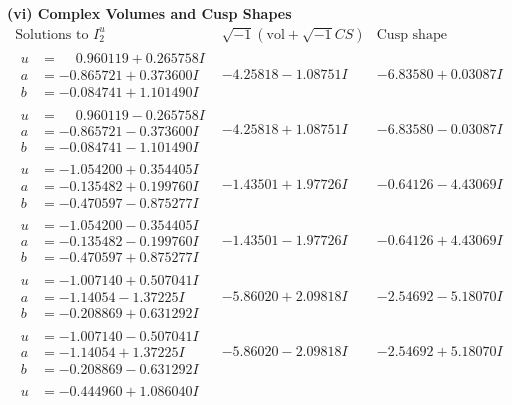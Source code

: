 \documentclass[1p]{elsarticle_modified}
\theoremstyle{definition}
\newcommand{\I}{\sqrt{-1}}
\begin{document}
\newpage\flushleft \textbf{(vi) Complex Volumes and Cusp Shapes}
$$\begin{array}{c|c|c}  
\text{Solutions to }I^u_{2}& \I (\text{vol} + \sqrt{-1}CS) & \text{Cusp shape}\\
 \hline 
\begin{aligned}
u &= \phantom{-}0.960119 + 0.265758 I \\
a &= -0.865721 + 0.373600 I \\
b &= -0.084741 + 1.101490 I\end{aligned}
 & -4.25818 - 1.08751 I & -6.83580 + 0.03087 I \\ \hline\begin{aligned}
u &= \phantom{-}0.960119 - 0.265758 I \\
a &= -0.865721 - 0.373600 I \\
b &= -0.084741 - 1.101490 I\end{aligned}
 & -4.25818 + 1.08751 I & -6.83580 - 0.03087 I \\ \hline\begin{aligned}
u &= -1.054200 + 0.354405 I \\
a &= -0.135482 + 0.199760 I \\
b &= -0.470597 - 0.875277 I\end{aligned}
 & -1.43501 + 1.97726 I & -0.64126 - 4.43069 I \\ \hline\begin{aligned}
u &= -1.054200 - 0.354405 I \\
a &= -0.135482 - 0.199760 I \\
b &= -0.470597 + 0.875277 I\end{aligned}
 & -1.43501 - 1.97726 I & -0.64126 + 4.43069 I \\ \hline\begin{aligned}
u &= -1.007140 + 0.507041 I \\
a &= -1.14054 - 1.37225 I \\
b &= -0.208869 + 0.631292 I\end{aligned}
 & -5.86020 + 2.09818 I & -2.54692 - 5.18070 I \\ \hline\begin{aligned}
u &= -1.007140 - 0.507041 I \\
a &= -1.14054 + 1.37225 I \\
b &= -0.208869 - 0.631292 I\end{aligned}
 & -5.86020 - 2.09818 I & -2.54692 + 5.18070 I \\ \hline\begin{aligned}
u &= -0.444960 + 1.086040 I \\

\end{aligned}
\end{array}$$
\end{document}
